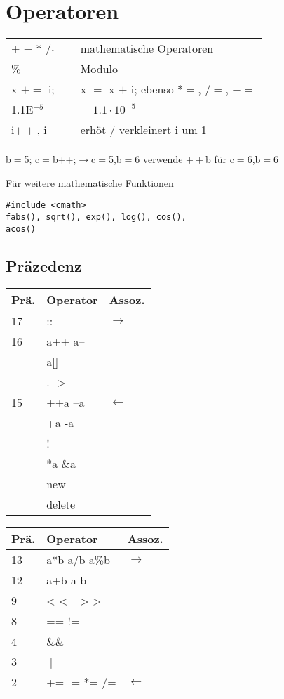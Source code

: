 \section{Operatoren}

\begin{center}
	\begin{tabular}{ ll } 
		$+$ $-$ $\ast$ $/$ $\hat{}$ & mathematische Operatoren\\
		 \% & Modulo\\
		x $+=$ i; & x $=$ x $+$ i; ebenso $*=$, $/=$, $-=$\\
		1.1E$^{-5}$ & = $1.1\cdot10^{-5}$\\
		i$++$, i$--$ & erhöt / verkleinert i um 1
	\end{tabular}
\end{center}
b$=$5; c$=$b++;$\rightarrow$c$=$5,b$=$6 verwende $++$b für c$=$6,b$=$6

Für weitere mathematische Funktionen
\begin{lstlisting}
#include <cmath>
fabs(), sqrt(), exp(), log(), cos(),
acos()
\end{lstlisting}
\subsection{Präzedenz}
\begin{multicols}{2}
\begin{tabular}{p{}|p{}|p{}}
	Prä. & Operator & Assoz.\\ \hline 
	17 & :: & $\rightarrow$\\
	16 & a++ a-- & \\
	& a[] & \\
	& . -> & \\
	15 & ++a --a & $\leftarrow$\\
	 & +a -a & \\
	 &! & \\
	 & *a \&a & \\
	 & new  & \\
	 & delete & 
\end{tabular}
\begin{tabular}{p{}|p{}|p{}}
	Prä. & Operator & Assoz.\\ \hline 
	 13& a*b a/b a\%b & $\rightarrow$\\	
	 12 & a+b a-b &\\
	 9 & < <= > >= & \\
	 8 & == != &\\
	 4 & \&\& & \\
	 3 & || & \\
	 2 & += -= *= /= &$\leftarrow$
\end{tabular}
\end{multicols}













